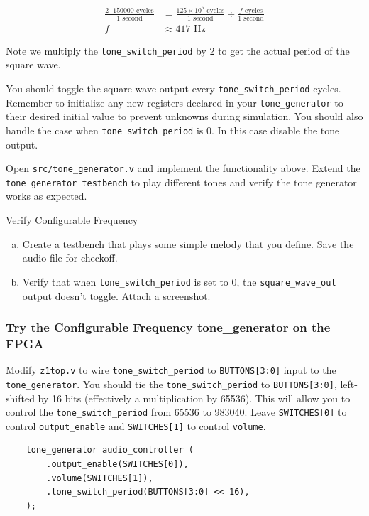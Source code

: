 \documentclass[11pt]{article}
\begin{document}
\begin{align*}
  \frac{2 \cdot 150000 \text{ cycles}}{1 \text{ second}} &= \frac{125 \times 10^6 \text{ cycles}}{1 \text{ second}} \div \frac{f \text{ cycles}}{1 \text{ second}} \\
  f &\approx 417 \text{ Hz}
\end{align*}

Note we multiply the \verb|tone_switch_period| by 2 to get the actual period of the square wave.

You should toggle the square wave output every \verb|tone_switch_period| cycles.
Remember to initialize any new registers declared in your \verb|tone_generator| to their desired initial value to prevent unknowns during simulation.
You should also handle the case when \verb|tone_switch_period| is 0. In this case disable the tone output.

Open \verb|src/tone_generator.v| and implement the functionality above.
Extend the \verb|tone_generator_testbench| to play different tones and verify the tone generator works as expected.

\begin{texexptitled}{Verify Configurable Frequency}{}
  \begin{enumerate}[a)]
    \item Create a testbench that plays some simple melody that you define. Save the audio file for checkoff.
    \item Verify that when \verb|tone_switch_period| is set to 0, the \verb|square_wave_out| output doesn't toggle. Attach a screenshot.
  \end{enumerate}
\end{texexptitled}

\subsubsection{Try the Configurable Frequency tone\_generator on the FPGA}
Modify \verb|z1top.v| to wire \verb|tone_switch_period| to \verb|BUTTONS[3:0]|
input to the \verb|tone_generator|. You should tie the \verb|tone_switch_period| to \verb|BUTTONS[3:0]|, left-shifted by 16 bits (effectively a multiplication by 65536).
This will allow you to control the \verb|tone_switch_period| from 65536 to 983040.
Leave \verb|SWITCHES[0]| to control \verb|output_enable| and \verb|SWITCHES[1]| to control \verb|volume|.

\begin{verbatim}
    tone_generator audio_controller (
        .output_enable(SWITCHES[0]),
        .volume(SWITCHES[1]),
        .tone_switch_period(BUTTONS[3:0] << 16),
    );
\end{verbatim}
\end{document}
